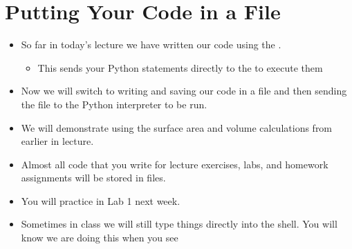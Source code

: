 \documentclass[letterpaper,10pt,english]{sphinxmanual}
\begin{document}
\section{Putting Your Code in a File}
\label{\detokenize{lecture_notes/lec02_calculator:putting-your-code-in-a-file}}\begin{itemize}
\item {} 
So far in today’s lecture we have written our code using the .
\begin{itemize}
\item {} 
This sends your Python statements directly to the  to
execute them

\end{itemize}

\item {} 
Now we will switch to writing and saving our code in a file and then
sending the file to the Python interpreter to be run.

\item {} 
We will demonstrate using the surface area and volume calculations
from earlier in lecture.

\item {} 
Almost all code that you write for lecture exercises, labs, and
homework assignments will be stored in files.

\item {} 
You will practice in Lab 1 next week.

\item {} 
Sometimes in class we will still type things directly into the
shell.  You will know we are doing this when you see \sphinxcode{\sphinxupquote{\textgreater{}\textgreater{}\textgreater{}}}

\end{itemize}
\end{document}
